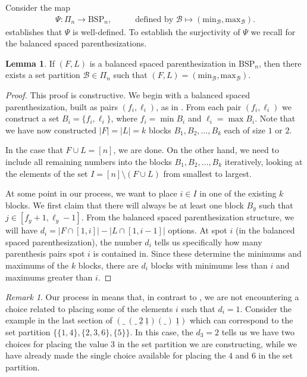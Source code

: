 \documentclass{amsart}
\newcommand{\BSP}{\mathrm{BSP}}
\newcommand{\mB}{\mathcal B}
\newcommand{\minB}{\mathrm{min}_\mB}
\newcommand{\maxB}{\mathrm{max}_\mB}
\theoremstyle{definition}
\newtheorem{lemma}[theorem]{Lemma}
\theoremstyle{definition}
\theoremstyle{remark}
\newtheorem*{remark}{Remark}
\begin{document}
Consider the map 
\begin{align}
\Psi:\Pi_n\to\BSP_n, &\qquad \mbox{defined by }\mB\mapsto(\minB,\maxB).
\label{def:Psi}
\end{align}
 establishes that $\Psi$ is well-defined. 
To establish the surjectivity of $\Psi$ we recall  for the balanced spaced parenthesizations. 

\begin{lemma}\label{lem:BSP to SP}
    If $(F,L)$ is a balanced spaced parenthesization in $\BSP_n$, then there exists a set partition $\mB\in\Pi_n$ such that $(F,L)=(\minB,\maxB)$.
\end{lemma}
\begin{proof}
This proof is constructive.
We begin with a balanced spaced parenthesization, built as pairs $(f_i, \ell_i)$, as in .
From each pair $(f_i,\ell_i)$ we construct a set $B_i=\{f_i,\ell_i\}$, where $f_i=\min B_i$ and $\ell_i=\max B_i$.
Note that we have now constructed $|F|=|L|=k$ blocks $B_1,B_2,\ldots, B_{k}$ each of size $1$ or $2$.

In the case that $F\cup L=[n]$, we are done. 
On the other hand, 
we need to include all remaining numbers into the blocks $B_1,B_2,\ldots,B_k$ iteratively, looking at the elements of the set $I=[n]\setminus(F\cup L)$ from smallest to largest. 

At some point in our process, we want to place $i\in I$ in one of the existing $k$ blocks. We first claim that there will always be at least one block $B_y$ such that $j\in [f_y+1, \ell_y-1]$.
From the balanced spaced parenthesization structure, we will have $d_i=|F\cap[1,i]|-|L\cap[1,i-1]|$ options. At spot $i$ (in the balanced spaced parenthesization), the number $d_i$ tells us specifically how many parenthesis pairs spot $i$ is contained in. 
Since these determine the minimums and maximums of the $k$ blocks, there are $d_i$ blocks with minimums less than $i$ and maximums greater than $i$.
\end{proof}


\begin{remark}
    Our process in  means that, in contrast to , we are not encountering a choice related to placing some of the elements $i$ such that $d_i=1$. Consider the example in the last section of $(\_\ (\_\ \underline{2}\ \underline{1})(\_)\ \underline{1})$ which can correspond to the set partition $\{\{1,4\},\{2,3,6\},\{5\}\}$. In this case, 
    the $d_3=2$ tells us we have two choices for placing the value $3$ in the set partition we are constructing, while we have already made the single choice available for placing the $4$ and $6$ in the set partition.
\end{remark}
\end{document}
